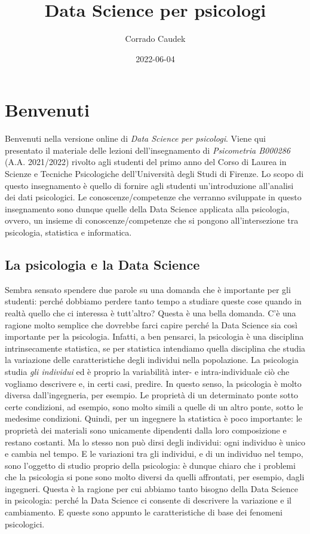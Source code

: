 \documentclass[
]{book}
\title{Data Science per psicologi}
\author{Corrado Caudek}
\date{2022-06-04}
\theoremstyle{definition}
\theoremstyle{definition}
\theoremstyle{definition}
\theoremstyle{definition}
\theoremstyle{remark}
\begin{document}
\maketitle

{
\setcounter{tocdepth}{1}
\tableofcontents
}
\hypertarget{benvenuti}{%
\chapter*{Benvenuti}\label{benvenuti}}

Benvenuti nella versione online di \emph{Data Science per psicologi}. Viene qui presentato il materiale delle lezioni dell'insegnamento di \emph{Psicometria B000286} (A.A. 2021/2022) rivolto agli studenti del primo anno del Corso di Laurea in Scienze e Tecniche Psicologiche dell'Università degli Studi di Firenze. Lo scopo di questo insegnamento è quello di fornire agli studenti un'introduzione all'analisi dei dati psicologici. Le conoscenze/competenze che verranno sviluppate in questo insegnamento sono dunque quelle della Data Science applicata alla psicologia, ovvero, un insieme di conoscenze/competenze che si pongono all'intersezione tra psicologia, statistica e informatica.

\hypertarget{la-psicologia-e-la-data-science}{%
\section*{La psicologia e la Data Science}\label{la-psicologia-e-la-data-science}}

Sembra sensato spendere due parole su una domanda che è importante per gli studenti: perché dobbiamo perdere tanto tempo a studiare queste cose quando in realtà quello che ci interessa è tutt'altro? Questa è una bella domanda. C'è una ragione molto semplice che dovrebbe farci capire perché la Data Science sia così importante per la psicologia. Infatti, a ben pensarci, la psicologia è una disciplina intrinsecamente statistica, se per statistica intendiamo quella disciplina che studia la variazione delle caratteristiche degli individui nella popolazione. La psicologia studia \emph{gli individui} ed è proprio la variabilità inter- e intra-individuale ciò che vogliamo descrivere e, in certi casi, predire. In questo senso, la psicologia è molto diversa dall'ingegneria, per esempio. Le proprietà di un determinato ponte sotto certe condizioni, ad esempio, sono molto simili a quelle di un altro ponte, sotto le medesime condizioni. Quindi, per un ingegnere la statistica è poco importante: le proprietà dei materiali sono unicamente dipendenti dalla loro composizione e restano costanti. Ma lo stesso non può dirsi degli individui: ogni individuo è unico e cambia nel tempo. E le variazioni tra gli individui, e di un individuo nel tempo, sono l'oggetto di studio proprio della psicologia: è dunque chiaro che i problemi che la psicologia si pone sono molto diversi da quelli affrontati, per esempio, dagli ingegneri. Questa è la ragione per cui abbiamo tanto bisogno della Data Science in psicologia: perché la Data Science ci consente di descrivere la variazione e il cambiamento. E queste sono appunto le caratteristiche di base dei fenomeni psicologici.
\end{document}
